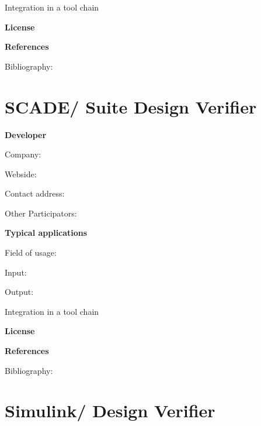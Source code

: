 \documentclass{./template/openetcs2}
\begin{document}


	Integration in a tool chain



	\textbf{License}


	\textbf{References}

	Bibliography:


\section{SCADE/  Suite Design Verifier}

	\textbf{Developer}

	Company: 

	Webside:

	Contact address:

	Other  Participators:



	\textbf{Typical applications}

	Field of usage:


	Input:

	Output:





	Integration in a tool chain



	\textbf{License}


	\textbf{References}

	Bibliography:


\section{Simulink/ Design Verifier}
\end{document}
